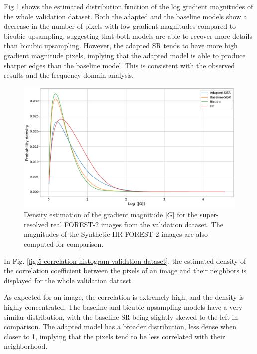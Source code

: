         Fig \ref{fig:5-gradient-histogram-validation-dataset} shows the estimated distribution function of the log gradient magnitudes of the whole validation dataset.
        Both the adapted and the baseline models show a decrease in the number of pixels with low gradient magnitudes compared to bicubic upsampling, suggesting that both models are able to recover more details than bicubic upsampling. 
        However, the adapted SR tends to have more high gradient magnitude pixels, implying that the adapted model is able to produce sharper edges than the baseline model.
        This is consistent with the observed results and the frequency domain analysis.
        
        \begin{figure}[H]
            \centering
            \includegraphics[scale=0.4]{Includes/5-gradient-histogram-validation-dataset.pdf}
            \caption{Density estimation of the gradient magnitude $|G|$ for the super-resolved real FOREST-2 images from the validation dataset. The magnitudes of the Synthetic HR FOREST-2 images are also computed for comparison.}
            \label{fig:5-gradient-histogram-validation-dataset}
        \end{figure}

        In Fig. \ref{fig:5-correlation-histogram-validation-dataset}, the estimated density of the correlation coefficient between the pixels of an image and their neighbors is displayed for the whole validation dataset. 
        
        As expected for an image, the correlation is extremely high, and the density is highly concentrated. The baseline and bicubic upsampling models have a very similar distribution, with the baseline SR being slightly skewed to the left in comparison.
        The adapted model has a broader distribution, less dense when closer to 1, implying that the pixels tend to be less correlated with their neighborhood. 
        
